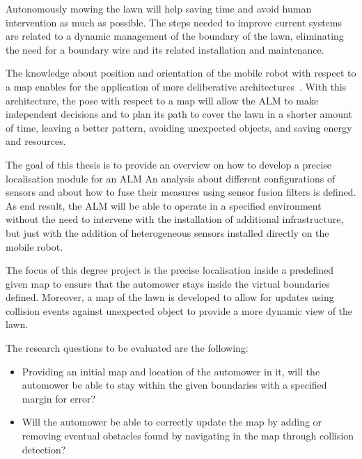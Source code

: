 \noindent Autonomously mowing the lawn will help saving time and avoid human intervention as much as possible. The steps needed to improve current systems are related to a dynamic management of the boundary of the lawn, eliminating the need for a boundary wire and its related installation and maintenance.

The knowledge about position and orientation of the mobile robot with respect to a map enables for the application of more deliberative architectures~\cite{genesereth_logical_1987}.
With this architecture, the pose with respect to a map will allow the \gls{ALM} to make independent decisions and to plan its path to cover the lawn in a shorter amount of time, leaving a better pattern, avoiding unexpected objects, and saving energy and resources.

The goal of this thesis is to provide an overview on how to develop a precise localisation module for an \gls{ALM}
An analysis about different configurations of sensors and about how to fuse their measures using sensor fusion filters is defined.
As end result, the \gls{ALM} will be able to operate in a specified environment without the need to intervene with the installation of additional infrastructure, but just with the addition of heterogeneous sensors installed directly on the mobile robot.

The focus of this degree project is the precise localisation inside a predefined given map to ensure that the automower stays inside the virtual boundaries defined.
Moreover, a map of the lawn is developed to allow for updates using collision events against unexpected object to provide a more dynamic view of the lawn.

The research questions to be evaluated are the following:
\begin{itemize}
    \item Providing an initial map and location of the automower in it, will the automower be able to stay within the given boundaries with a specified margin for error?
    \item Will the automower be able to correctly update the map by adding or removing eventual obstacles found by navigating in the map through collision detection?
\end{itemize}

